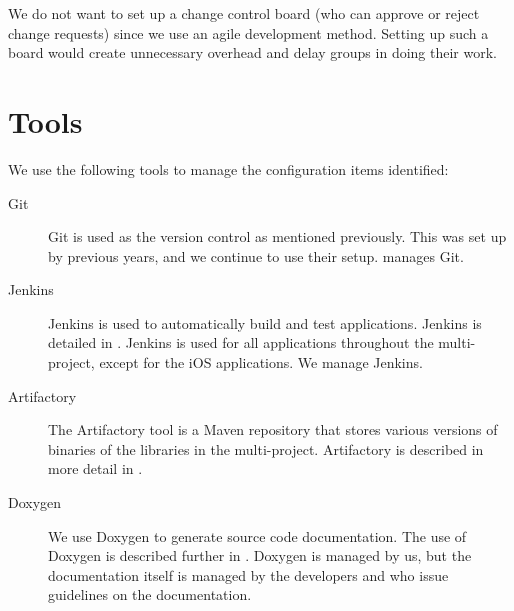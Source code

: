 We do not want to set up a change control board\parencite[p. 6-9]{swebok} (who can approve or reject change requests) since we use an agile development method. Setting up such a board would create unnecessary overhead and delay groups in doing their work.

\section{Tools}\label{sec:SCM_tools}
We use the following tools to manage the configuration items identified:

\begin{description}
  \item[Git] Git is used as the version control as mentioned previously. This was set up by previous years, and we continue to use their setup.  manages Git.
  \item[Jenkins] Jenkins is used to automatically build and test applications. Jenkins is detailed in . Jenkins is used for all applications throughout the multi-project, except for the iOS applications. We manage Jenkins.
  \item[Artifactory] The Artifactory tool is a Maven repository that stores various versions of binaries of the libraries in the multi-project. Artifactory is described in more detail in .
  \item[Doxygen] We use Doxygen to generate source code documentation. The use of Doxygen is described further in . Doxygen is managed by us, but the documentation itself is managed by the developers and  who issue guidelines on the documentation.
\end{description}